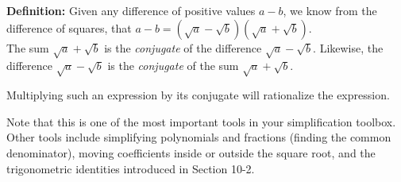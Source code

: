 \documentclass{ximera}
\begin{document}
\begin{callout}
  {\bf Definition:} 
  Given any difference of positive values $a-b$, we know from the difference of squares, that $a-b = (\sqrt{a}-\sqrt{b})(\sqrt{a}+\sqrt{b})$. \\
  The sum $\sqrt{a}+\sqrt{b}$ is the {\it conjugate} of the difference $\sqrt{a}-\sqrt{b}$.
  Likewise, the difference $\sqrt{a}-\sqrt{b}$ is the {\it conjugate} of the sum $\sqrt{a}+\sqrt{b}$.
 
 Multiplying such an expression by its conjugate will rationalize the expression.
  \end{callout}
%
Note that this is one of the most important tools in your simplification toolbox. Other tools include simplifying polynomials and fractions (finding the common denominator), moving coefficients inside or outside the square root, and the trigonometric identities introduced in Section 10-2.
\end{document}
